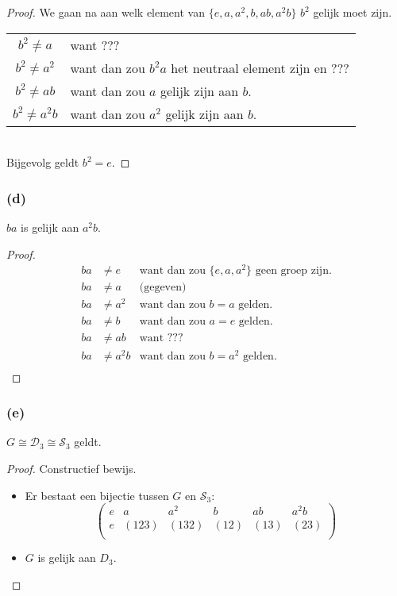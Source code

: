 \documentclass[main.tex]{subfiles}
\begin{document}
\begin{proof}
  We gaan na aan welk element van $\{ e,a,a^{2},b,ab,a^{2}b \}$ $b^{2}$ gelijk moet zijn.\\
  \begin{tabular}[H]{cl}
    \centering
    $b^{2} \neq  a$ & want ???\\
    $b^{2} \neq  a^{2}$ & want dan zou $b^{2}a$ het neutraal element zijn en ???\\
    $b^{2} \neq  ab$ & want dan zou $a$ gelijk zijn aan $b$.\\
    $b^{2} \neq  a^{2}b$ & want dan zou $a^{2}$ gelijk zijn aan $b$.\\
  \end{tabular}\\
  Bijgevolg geldt $b^{2} = e$.
\end{proof}


\subsubsection*{(d)}
$ba$ is gelijk aan $a^{2}b$.

\begin{proof}
  \[
  \begin{array}{rll}
    ba &\neq e &\text{want dan zou } \{ e,a,a^{2} \} \text{ geen groep zijn.}\\ 
    ba &\neq a &\text{(gegeven)}\\ 
    ba &\neq a^{2} &\text{want dan zou } b=a \text{ gelden.} \\ 
    ba &\neq b &\text{want dan zou } a=e \text{ gelden.} \\ 
    ba &\neq ab &\text{want ???} \\ 
    ba &\neq a^{2}b &\text{want dan zou } b=a^{2} \text{ gelden.} \\ 
  \end{array}
  \]
\end{proof}

\subsubsection*{(e)}
$G \cong \mathcal{D}_{3} \cong \mathcal{S}_{3}$ geldt.

\begin{proof}
  Constructief bewijs.
  \begin{itemize}
  \item Er bestaat een bijectie tussen $G$ en $\mathcal{S}_{3}$:
    \[
    \begin{pmatrix}
      e & a     & a^{2} & b    & ab   & a^{2}b\\
      e & (123) & (132) & (12) & (13) & (23)\\
    \end{pmatrix}
    \]
  \item $G$ is gelijk aan $D_{3}$.
  \end{itemize}
\end{proof}
\end{document}

